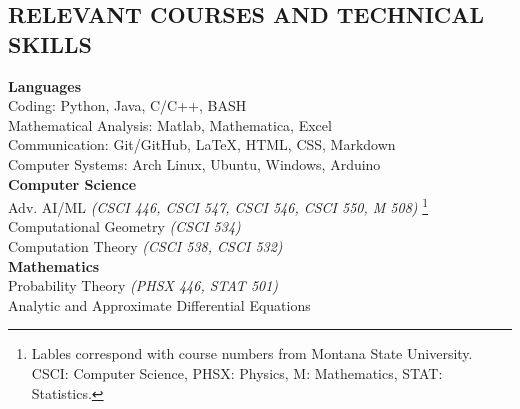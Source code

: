 \documentclass[margin]{res}
\begin{document}
\begin{resume}
\section{\uppercase{Relevant Courses and Technical \\Skills}}
{
\textbf{Languages}\\
	\hspace{3ex} Coding: Python, Java, C/C++, BASH\\
	\hspace{3ex} Mathematical Analysis: Matlab, Mathematica, Excel\\
	\hspace{3ex} Communication: Git/GitHub, LaTeX, HTML, CSS, Markdown\\
	\hspace{3ex} Computer Systems: Arch Linux, Ubuntu, Windows, Arduino\vspace*{1ex}\\
\textbf{Computer Science} \\
	\hspace{3ex} Adv. AI/ML \textit{(CSCI 446, CSCI 547, CSCI 546, CSCI 550, M 508)}
		\footnote{Lables correspond with course numbers from Montana State University. CSCI: Computer Science, PHSX: Physics, M: Mathematics, STAT: Statistics.}\\
	\hspace{3ex} Computational Geometry \textit{(CSCI 534)}\\
	\hspace{3ex} Computation Theory \textit{(CSCI 538, CSCI 532)}\vspace{3ex}\\
\textbf{Mathematics}\\ 
	\hspace{3ex} Probability Theory \textit{(PHSX 446, STAT 501)}\\
	\hspace{3ex} Analytic and Approximate Differential Equations\\
}
\end{resume}
\end{document}
